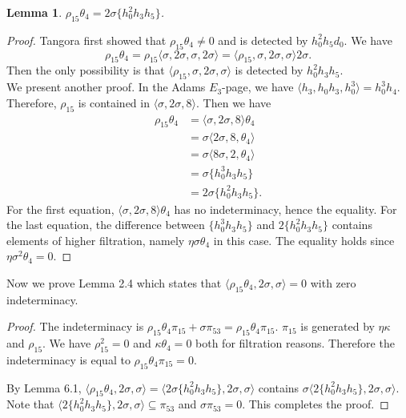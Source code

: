 \documentclass[psamsfonts]{amsart}
\newtheorem{lem}[thm]{Lemma}
\theoremstyle{definition}
\numberwithin{equation}{section}
\begin{document}
\begin{lem}
$\rho_{15}\theta_4=2\sigma\{h_0^2h_3h_5\}$.
\end{lem}

\begin{proof}
Tangora first showed that $\rho_{15}\theta_4\neq0$ and is detected by $h_0^2h_5d_0$. We have
$$\rho_{15}\theta_4 = \rho_{15} \langle\sigma,2\sigma,\sigma,2\sigma\rangle=\langle\rho_{15} ,\sigma,2\sigma,\sigma\rangle 2\sigma.$$
Then the only possibility is that $\langle\rho_{15} ,\sigma,2\sigma,\sigma\rangle$ is detected by $h_0^2h_3h_5$.\\

We present another proof. In the Adams $E_3$-page, we have $\langle h_3,h_0h_3, h_0^3\rangle = h_0^3h_4$. Therefore, $\rho_{15}$ is contained in $\langle \sigma, 2\sigma, 8\rangle$. Then we have
\begin{equation*}
\begin{split}
\rho_{15}\theta_4 & = \langle \sigma, 2\sigma, 8 \rangle \theta_4 \\
& = \sigma \langle 2\sigma, 8, \theta_4 \rangle \\
& = \sigma \langle 8\sigma, 2, \theta_4 \rangle \\
& = \sigma \{h_0^3h_3h_5\} \\
& = 2 \sigma \{h_0^2h_3h_5\}.
\end{split}
\end{equation*}
For the first equation, $\langle \sigma, 2\sigma, 8 \rangle \theta_4$ has no indeterminacy, hence the equality.
For the last equation, the difference between $\{h_0^3h_3h_5\}$ and $2\{h_0^2h_3h_5\}$ contains elements of higher filtration, namely $\eta\sigma\theta_4$ in this case. The equality holds since $\eta\sigma^2\theta_4=0$.
\end{proof}

Now we prove Lemma 2.4 which states that $\langle\rho_{15}\theta_4, 2\sigma, \sigma\rangle=0$ with zero indeterminacy.

\begin{proof}
The indeterminacy is $\rho_{15}\theta_4\pi_{15}+\sigma \pi_{53}=\rho_{15}\theta_4\pi_{15}$. $\pi_{15}$ is generated by $\eta\kappa$ and $\rho_{15}$. We have $\rho_{15}^2=0$ and $\kappa\theta_4=0$ both for filtration reasons. Therefore the indeterminacy is equal to $\rho_{15}\theta_4\pi_{15}=0$.

By Lemma 6.1, $\langle\rho_{15}\theta_4, 2\sigma, \sigma\rangle=\langle2 \sigma \{h_0^2h_3h_5\}, 2 \sigma, \sigma\rangle$ contains $\sigma \langle 2 \{h_0^2h_3h_5\}, 2 \sigma, \sigma\rangle$. Note that $\langle 2 \{h_0^2h_3h_5\}, 2 \sigma, \sigma\rangle\subseteq\pi_{53}$ and $\sigma\pi_{53}=0$. This completes the proof.
\end{proof}
\end{document}

